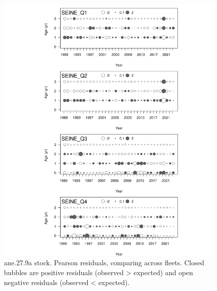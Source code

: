 \documentclass[
]{article}
\begin{document}
\begin{figure}[H]

{\centering \includegraphics[width=0.95\linewidth]{Report_SS3_quarter_with_age_data_S1.0_4FLEETS_files/figure-latex/unnamed-chunk-26-1} 

}

\caption{ane.27.9a stock.  Pearson residuals, comparing across fleets. Closed bubbles are positive residuals (observed > expected) and open negative residuals (observed < expected).}\label{fig:unnamed-chunk-26}
\end{figure}
\end{document}

